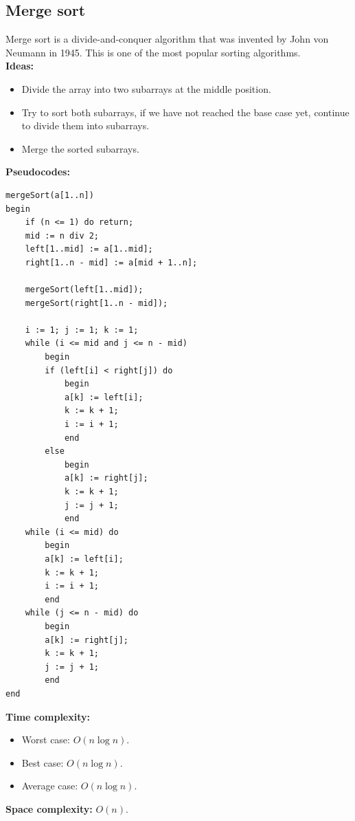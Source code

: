 \documentclass[12pt,a4paper]{article}
\begin{document}
\subsection{Merge sort}
Merge sort is a divide-and-conquer algorithm that was invented by John von Neumann in 1945. This is one of the most popular sorting algorithms. \\
\textbf{Ideas:} 
\begin{itemize}
\item Divide the array into two subarrays at the middle position.
\item Try to sort both subarrays, if we have not reached the base case yet, continue to divide them into subarrays.
\item Merge the sorted subarrays.
\end{itemize}
\textbf{Pseudocodes:}
\lstset{language=Pascal} 
\begin{lstlisting}
mergeSort(a[1..n])
begin
	if (n <= 1) do return;
	mid := n div 2;
	left[1..mid] := a[1..mid];
	right[1..n - mid] := a[mid + 1..n];
	
	mergeSort(left[1..mid]);
	mergeSort(right[1..n - mid]);
	
	i := 1; j := 1; k := 1;
	while (i <= mid and j <= n - mid)
		begin
		if (left[i] < right[j]) do 
			begin 
			a[k] := left[i];
			k := k + 1;
			i := i + 1;
			end 
		else 
			begin
			a[k] := right[j];
			k := k + 1;
			j := j + 1;
			end
	while (i <= mid) do
		begin
		a[k] := left[i];
		k := k + 1;
		i := i + 1;	
		end
	while (j <= n - mid) do
		begin
		a[k] := right[j];
		k := k + 1;
		j := j + 1;
		end
end
\end{lstlisting}
\textbf{Time complexity:}  \cite{merge}
\begin{itemize}
\item Worst case: $O \left( {n \log n} \right).$
\item Best case: $O \left( {n \log n} \right).$
\item Average case: $O \left( {n \log n} \right).$
\end{itemize}
\textbf{Space complexity:} $O \left( {n} \right).$ \cite{merge}
\end{document}
